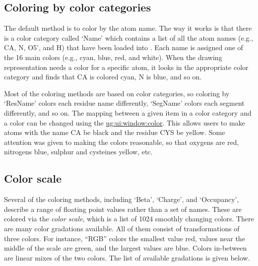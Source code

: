 \subsection{Coloring by color categories}
\label{ug:topic:coloring:categories}

The default method is to color by the atom name.  The way it works is
that there is a color category called `Name' which contains a list of
all the atom names (e.g., CA, N, O5', and H) that have been loaded into
\VMD.  Each name is assigned one of the 16 main colors (e.g., cyan, blue, red,
and white).  When the drawing representation needs a color for a
specific atom, it looks in the appropriate color category and finds
that CA is colored cyan, N is blue, and so on.

Most of the coloring methods are based on color categories, so
coloring by `ResName' colors each residue name differently, `SegName'
colors each segment differently, and so on.  The mapping between a
given item in a color category and a color can be changed using the
\hyperref{{\sf Color} window}{{\sf Color} window [\S}{]}{ug:ui:window:color}.
This allows users to make atoms with the name CA be black and the
residue CYS be yellow.  Some attention was given to making the colors
reasonable, so that oxygens are red, nitrogens blue, sulphur and
cysteines yellow, etc.

\subsection{Color scale}
\label{ug:topic:coloring:scale}

Several of the coloring methods, including `Beta', `Charge', and
`Occupancy', describe a range of floating point values rather than a
set of names.  These are colored via the {\em color scale}, which is a
list of 1024 smoothly changing colors.  There are many color gradations
available.  All of them consist of transformations of three colors.
For instance, ``RGB'' colors the smallest value red, values near the
middle of the scale are green, and the largest values are blue.
Colors in-between are linear mixes of the two colors.  The list of 
available gradations is given below.


